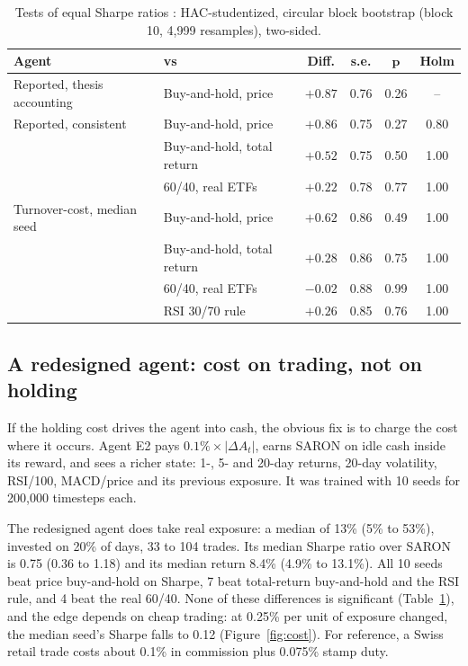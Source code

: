 \documentclass[11pt,a4paper]{article}
\begin{document}
\begin{table}[ht]
\centering\small
\caption{Tests of equal Sharpe ratios \citep{ledoit2008}: HAC-studentized, circular block bootstrap (block 10, 4,999 resamples), two-sided.}
\label{tab:tests}
\begin{tabular}{@{}llcccc@{}}
\toprule
\textbf{Agent} & \textbf{vs} & \textbf{Diff.} & \textbf{s.e.} & $\boldsymbol{p}$ & \textbf{Holm} \\
\midrule
Reported, thesis accounting & Buy-and-hold, price & $+0.87$ & 0.76 & 0.26 & -- \\
\addlinespace
Reported, consistent & Buy-and-hold, price & $+0.86$ & 0.75 & 0.27 & 0.80 \\
 & Buy-and-hold, total return & $+0.52$ & 0.75 & 0.50 & 1.00 \\
 & 60/40, real ETFs & $+0.22$ & 0.78 & 0.77 & 1.00 \\
\addlinespace
Turnover-cost, median seed & Buy-and-hold, price & $+0.62$ & 0.86 & 0.49 & 1.00 \\
 & Buy-and-hold, total return & $+0.28$ & 0.86 & 0.75 & 1.00 \\
 & 60/40, real ETFs & $-0.02$ & 0.88 & 0.99 & 1.00 \\
 & RSI 30/70 rule & $+0.26$ & 0.85 & 0.76 & 1.00 \\
\bottomrule
\end{tabular}
\end{table}

\subsection{A redesigned agent: cost on trading, not on holding}\label{sec:turnover}

If the holding cost drives the agent into cash, the obvious fix is to charge the cost where it occurs. Agent E2 pays $0.1\%\times|\Delta A_t|$, earns SARON on idle cash inside its reward, and sees a richer state: 1-, 5- and 20-day returns, 20-day volatility, RSI/100, MACD/price and its previous exposure. It was trained with 10 seeds for 200,000 timesteps each.

The redesigned agent does take real exposure: a median of 13\% (5\% to 53\%), invested on 20\% of days, 33 to 104 trades. Its median Sharpe ratio over SARON is 0.75 (0.36 to 1.18) and its median return 8.4\% (4.9\% to 13.1\%). All 10 seeds beat price buy-and-hold on Sharpe, 7 beat total-return buy-and-hold and the RSI rule, and 4 beat the real 60/40. None of these differences is significant (Table~\ref{tab:tests}), and the edge depends on cheap trading: at 0.25\% per unit of exposure changed, the median seed's Sharpe falls to 0.12 (Figure~\ref{fig:cost}). For reference, a Swiss retail trade costs about 0.1\% in commission plus 0.075\% stamp duty.
\end{document}
